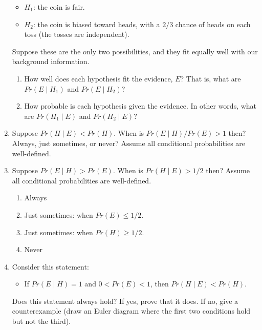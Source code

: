 \documentclass[justified]{tufte-book}
\providecommand{\tightlist}{%
  \setlength{\itemsep}{0pt}\setlength{\parskip}{0pt}}
\newcommand{\given}{\mid}
\newcommand{\p}{Pr}
\theoremstyle{definition}
\theoremstyle{definition}
\theoremstyle{definition}
\theoremstyle{definition}
\theoremstyle{remark}
\begin{document}
\begin{enumerate}
  \begin{itemize}
  \tightlist
  \item
    \(H_1\): the coin is fair.
  \item
    \(H_2\): the coin is biased toward heads, with a \(2/3\) chance of heads on each toss (the tosses are independent).
  \end{itemize}

  Suppose these are the only two possibilities, and they fit equally well with our background information.

  \begin{enumerate}
  \def\labelenumii{\alph{enumii}.}
  \tightlist
  \item
    How well does each hypothesis fit the evidence, \(E\)? That is, what are \(\p(E \given H_1)\) and \(\p(E \given H_2)\)?
  \item
    How probable is each hypothesis given the evidence. In other words, what are \(\p(H_1 \given E)\) and \(\p(H_2 \given E)\)?
  \end{enumerate}
\item
  Suppose \(\p(H \given E) < \p(H)\). When is \(\p(E \given H)/\p(E) > 1\) then? Always, just sometimes, or never? Assume all conditional probabilities are well-defined.
\item
  Suppose \(\p(E \given H) > \p(E)\). When is \(\p(H \given E) > 1/2\) then? Assume all conditional probabilities are well-defined.

  \begin{enumerate}
  \def\labelenumii{\alph{enumii}.}
  \tightlist
  \item
    Always
  \item
    Just sometimes: when \(\p(E) \leq 1/2\).
  \item
    Just sometimes: when \(\p(H) \geq 1/2\).
  \item
    Never
  \end{enumerate}
\item
  Consider this statement:

  \begin{itemize}
  \tightlist
  \item
    If \(\p(E \given H) = 1\) and \(0 < \p(E) < 1\), then \(\p(H \given E) < \p(H)\).
  \end{itemize}

  Does this statement always hold? If yes, prove that it does. If no, give a counterexample (draw an Euler diagram where the first two conditions hold but not the third).
\end{enumerate}
\end{document}
